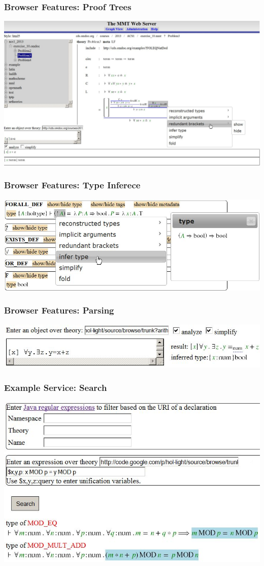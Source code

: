 \documentclass{beamer}
\begin{document}
\begin{frame}\frametitle{Browser Features: Proof Trees}
\includegraphics[width=\textwidth]{img/web-big.jpg}
\end{frame}

\begin{frame}\frametitle{Browser Features: Type Inferece}
\includegraphics[width=\textwidth]{img/type-inference.jpg}
\end{frame}

\begin{frame}\frametitle{Browser Features: Parsing}
\includegraphics[width=\textwidth]{img/parse.jpg}
\end{frame}

\begin{frame}\frametitle{Example Service: Search}
\includegraphics[width=\textwidth]{img/search.jpg}
\end{frame}
\end{document}
